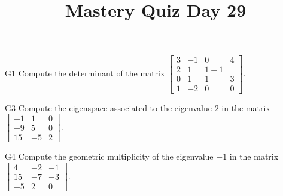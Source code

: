 \documentclass{sbgLAquiz}
\title{Mastery Quiz Day 29 }
\begin{document}
\begin{problem}{G1}
Compute the determinant of the matrix $\begin{bmatrix} 3 & -1 & 0 & 4 \\ 2 & 1 & 1 -1 \\ 0 & 1 & 1 & 3 \\ 1 & -2 & 0 & 0 \end{bmatrix}$.
\end{problem}

\begin{problem}{G3}
Compute the eigenspace associated to the eigenvalue $2$ in the matrix $\begin{bmatrix} -1 & 1 & 0 \\ -9 & 5 & 0 \\ 15 & -5 & 2 \end{bmatrix}$.
\end{problem}
\newpage

\begin{problem}{G4}
Compute the geometric multiplicity of the eigenvalue $-1$ in the matrix $\begin{bmatrix} 4 & -2 & -1 \\ 15 & -7 & -3 \\ -5 & 2 & 0 \end{bmatrix}$.  
\end{problem}
\end{document}
